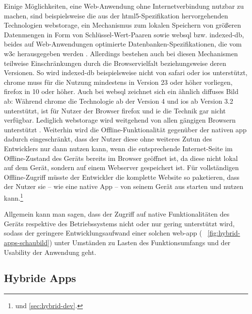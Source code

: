 Einige Möglichkeiten, eine Web-Anwendung ohne Internetverbindung nutzbar zu machen, sind beispielsweise die aus der \gls{html5}-Spezifikation hervorgehenden Technologien \gls{webstorage}, ein Mechanismus zum lokalen Speichern von größeren Datenmengen in Form von Schlüssel-Wert-Paaren \cite{w3c_webstorage} sowie \gls{websql} bzw. \gls{indexed-db}, beides auf Web-Anwendungen optimierte Datenbanken-Spezifikationen, die vom \gls{w3c} herausgegeben werden \cite{w3c_websql, w3c_indexedDB}.
Allerdings bestehen auch bei diesen Mechanismen teilweise Einschränkungen durch die Browservielfalt beziehungsweise deren Versionen. So wird \gls{indexed-db} beispielsweise nicht von \gls{safari} oder \gls{ios} unterstützt, \gls{chrome} muss für die Nutzung mindestens in Version 23 oder höher vorliegen, \gls{firefox} in 10 oder höher. 
Auch bei \gls{websql} zeichnet sich ein ähnlich diffuses Bild ab: Während \gls{chrome} die Technologie ab der Version 4 und \gls{ios} ab Version 3.2 unterstützt, ist für Nutzer der Browser \gls{firefox} und \gls{ie} die Technik gar nicht verfügbar.
Lediglich \gls{webstorage} wird weitgehend von allen gängigen Browsern unterstützt \cite{html5-rocks_offline}.
Weiterhin wird die Offline-Funktionalität gegenüber der nativen \gls{app} dadurch eingeschränkt, dass der Nutzer diese ohne weiteres Zutun des Entwicklers nur dann nutzen kann, wenn die entsprechende Internet-Seite im Offline-Zustand des Geräts bereits im Browser geöffnet ist, da diese nicht lokal auf dem Gerät, sondern auf einem Webserver gespeichert ist.
Für vollständigen Offline-Zugriff müsste der Entwickler die komplette Website so paketieren, dass der Nutzer sie -- wie eine native App -- von seinem Gerät aus starten und nutzen kann.\footnote{ und \ref{sec:hybrid-dev}.}

Allgemein kann man sagen, dass der Zugriff auf native Funktionalitäten des Geräts respektive des Betriebssystems nicht oder nur gering unterstützt wird, sodass der geringere Entwicklungsaufwand einer solchen \gls{web-app} (\seename~ \autoref{fig:hybrid-apps-schaubild}) unter Umständen zu Lasten des Funktionsumfangs und der Usability der Anwendung geht.

\subsection{Hybride Apps} \label{sec:hybrid-app}

